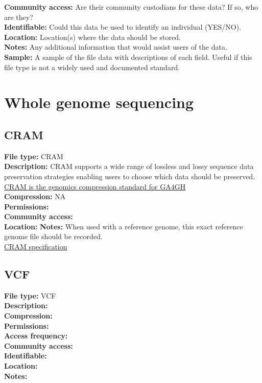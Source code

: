 \documentclass[
]{book}
\begin{document}
\textbf{Community access:} Are their community custodians for these data? If so, who are they?\\

\textbf{Identifiable:} Could this data be used to identify an individual (YES/NO).\\

\textbf{Location:} Location(s) where the data should be stored.\\

\textbf{Notes:} Any additional information that would assist users of the data.\\

\textbf{Sample:} A sample of the file data with descriptions of each field. Useful if this file type is not a widely used and documented standard.

\hypertarget{whole-genome-sequencing}{%
\chapter{Whole genome sequencing}\label{whole-genome-sequencing}}

\hypertarget{cram}{%
\section{CRAM}\label{cram}}

\textbf{File type:} CRAM\\
\textbf{Description:} CRAM supports a wide
range of lossless and lossy sequence data preservation strategies enabling users to choose which data should be preserved. \href{https://www.ga4gh.org/cram/}{CRAM is the genomics compression standard for GA4GH}\\
\textbf{Compression:} NA\\
\textbf{Permissions:}\\
\textbf{Community access:}\\
\textbf{Location:}
\textbf{Notes:} When used with a reference genome, this exact reference genome file should be recorded.\\
\href{https://samtools.github.io/hts-specs/CRAMv3.pdf}{CRAM specification}

\hypertarget{vcf}{%
\section{VCF}\label{vcf}}

\textbf{File type:} VCF\\
\textbf{Description:}\\
\textbf{Compression:}\\
\textbf{Permissions:}\\
\textbf{Access frequency:}\\
\textbf{Community access:}\\
\textbf{Identifiable:}\\
\textbf{Location:}\\
\textbf{Notes:}
\end{document}
